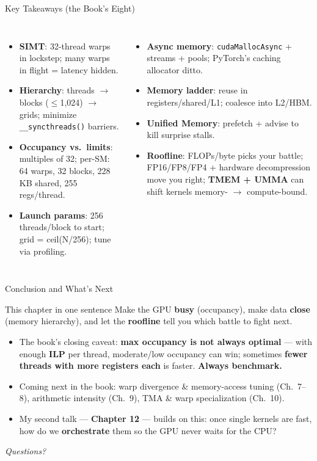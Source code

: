 \documentclass[aspectratio=169]{beamer}
\newcommand{\kw}[1]{\textbf{\textcolor{kwblue}{#1}}}
\begin{document}
\begin{frame}{Key Takeaways (the Book's Eight)}
  \begin{columns}[t]
    \begin{itemize}\small
      \item \kw{SIMT}: 32-thread warps in lockstep; many warps in flight = latency hidden.
      \item \kw{Hierarchy}: threads $\to$ blocks ($\leq$1{,}024) $\to$ grids; minimize
            \texttt{\_\_syncthreads()} barriers.
      \item \kw{Occupancy vs.\ limits}: multiples of 32; per-SM: 64 warps, 32 blocks,
            228 KB shared, 255 regs/thread.
      \item \kw{Launch params}: 256 threads/block to start; grid = ceil(N/256);
            tune via profiling.
    \end{itemize}
    \begin{itemize}\small
      \item \kw{Async memory}: \texttt{cudaMallocAsync} + streams + pools;
            PyTorch's caching allocator ditto.
      \item \kw{Memory ladder}: reuse in registers/shared/L1; coalesce into L2/HBM.
      \item \kw{Unified Memory}: prefetch + advise to kill surprise stalls.
      \item \kw{Roofline}: FLOPs/byte picks your battle; FP16/FP8/FP4 + hardware decompression
            move you right; \kw{TMEM + UMMA} can shift kernels memory- $\to$ compute-bound.
    \end{itemize}
  \end{columns}
\end{frame}

\begin{frame}{Conclusion and What's Next}
  \begin{block}{This chapter in one sentence}
    Make the GPU \kw{busy} (occupancy), make data \kw{close} (memory hierarchy),
    and let the \kw{roofline} tell you which battle to fight next.
  \end{block}
  \begin{itemize}
    \item The book's closing caveat: \kw{max occupancy is not always optimal} ---
          with enough \kw{ILP} per thread, moderate/low occupancy can win; sometimes
          \kw{fewer threads with more registers each} is faster. \kw{Always benchmark.}
    \item Coming next in the book: warp divergence \& memory-access tuning (Ch.\ 7--8),
          arithmetic intensity (Ch.\ 9), TMA \& warp specialization (Ch.\ 10).
    \item My second talk --- \kw{Chapter 12} --- builds on this: once single kernels are fast,
          how do we \kw{orchestrate} them so the GPU never waits for the CPU?
  \end{itemize}
  \medskip
  \centering\itshape Questions?
\end{frame}
\end{document}
